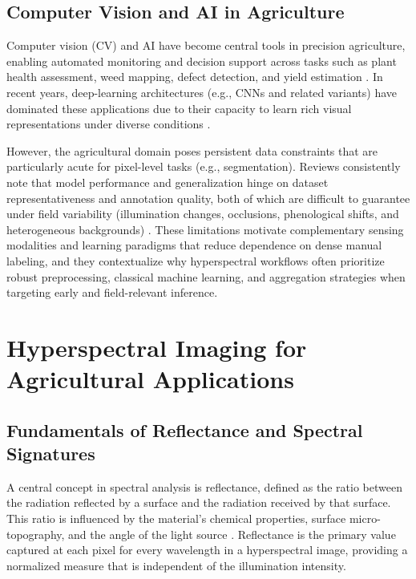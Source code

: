 \subsection{Computer Vision and AI in Agriculture}
\label{subsec:cv_ai_agriculture}

\noindent
Computer vision (CV) and AI have become central tools in precision agriculture, enabling automated monitoring and decision support across tasks such as plant health assessment, weed mapping, defect detection, and yield estimation \cite{tian2020computer, patricio2018computer, DHANYA2022211, cao2025review}. In recent years, deep-learning architectures (e.g., CNNs and related variants) have dominated these applications due to their capacity to learn rich visual representations under diverse conditions \cite{benos2021machine, ATTRI2023102217, ghazal2024computer}.

\medskip
\noindent
However, the agricultural domain poses persistent data constraints that are particularly acute for pixel-level tasks (e.g., segmentation). Reviews consistently note that model performance and generalization hinge on dataset representativeness and annotation quality, both of which are difficult to guarantee under field variability (illumination changes, occlusions, phenological shifts, and heterogeneous backgrounds) \cite{tian2020computer, patricio2018computer, benos2021machine, DHANYA2022211}. These limitations motivate complementary sensing modalities and learning paradigms that reduce dependence on dense manual labeling, and they contextualize why hyperspectral workflows often prioritize robust preprocessing, classical machine learning, and aggregation strategies when targeting early and field-relevant inference.

\section{Hyperspectral Imaging for Agricultural Applications}
\label{sec:hyperspectral_imaging}

\subsection{Fundamentals of Reflectance and Spectral Signatures}
\label{sec:reflectance_fundamentals}

\noindent
A central concept in spectral analysis is reflectance, defined as the ratio between the radiation reflected by a surface and the radiation received by that surface. This ratio is influenced by the material's chemical properties, surface micro-topography, and the angle of the light source \cite{blackburn2007}. Reflectance is the primary value captured at each pixel for every wavelength in a hyperspectral image, providing a normalized measure that is independent of the illumination intensity.

